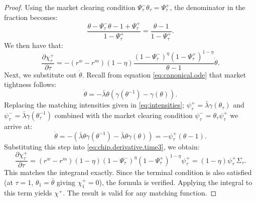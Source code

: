 \begin{proof}
Using the market clearing condition $\Psi^{-}_\tau\theta_\tau=\Psi^{+}_\tau$, the denominator in the fraction becomes:
\[
\frac{\theta-\Psi^{-}_\tau\theta-1+\Psi^{+}_\tau}{1-\Psi^{+}_\tau}=\frac{\theta-1}{1-\Psi^{+}_\tau}.
\]
We then have that:
\begin{equation}
\label{eq:chip.derivative.time3}
\frac{\partial \chi_\tau^+}{\partial \tau} = -(r^w - r^m)(1-\eta)\frac{(1-\Psi^{-}_\tau)^{\eta}(1-\Psi^{+}_\tau)^{1-\eta}}{\theta-1}\dot{\theta}.
\end{equation}
Next, we substitute out $\dot{\theta}$. Recall from equation \eqref{eq:canonical.ode} that market tightness follows:
\begin{equation*}
\dot{\theta} = -\bar{\lambda}\theta(\gamma(\theta^{-1}) - \gamma(\theta)).
\end{equation*}
Replacing the matching intensities given in \eqref{eq:intensities}; $\psi^+_\tau = \bar{\lambda}\gamma(\theta_\tau)$ and $ \psi^-_\tau = \bar{\lambda}\gamma(\theta_\tau^{-1})$ combined with the market clearing condition $\psi^-_\tau=\theta_\tau\psi^+_\tau$ we arrive at:
\begin{equation}
\label{eq:intensity.ode}
\dot{\theta} = -(\bar{\lambda}\theta\gamma(\theta^{-1}) - \bar{\lambda}\theta\gamma(\theta))=-\psi^+_\tau(\theta-1).
\end{equation}
Substituting this step into \eqref{eq:chip.derivative.time3}, we obtain:
\begin{equation}
\label{eq:chip.derivative.final}
\frac{\partial \chi_\tau^+}{\partial \tau} = (r^w - r^m)(1-\eta)(1-\Psi^{-}_\tau)^{\eta}(1-\Psi^{+}_\tau)^{1-\eta}\psi^+_\tau=(1-\eta)\psi^+_\tau\Sigma_\tau.
\end{equation}
This matches the integrand exactly. Since the terminal condition is also satisfied (at $\tau = 1$, $\theta_1 = \bar{\theta}$ giving $\chi^+_1 = 0$), the formula is verified. Applying the integral to this term yields $\chi^{+}$. The result is valid for any matching function.


\end{proof}
